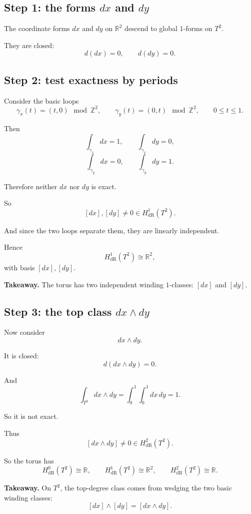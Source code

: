 \documentclass[11pt]{article}
\newenvironment{takeaway}
{\begin{framed}\noindent\textbf{Takeaway. }}
{\end{framed}}
\begin{document}
\subsection{Step 1: the forms \(dx\) and \(dy\)}

The coordinate forms \(dx\) and \(dy\) on \(\mathbb{R}^2\) descend to global \(1\)-forms on \(T^2\).

They are closed:
\[
d(dx)=0,\qquad d(dy)=0.
\]

\subsection{Step 2: test exactness by periods}

Consider the basic loops
\[
\gamma_x(t)=(t,0)\mod\mathbb{Z}^2,\qquad
\gamma_y(t)=(0,t)\mod\mathbb{Z}^2,\qquad 0\le t\le 1.
\]

Then
\[
\int_{\gamma_x}dx=1,\qquad \int_{\gamma_x}dy=0,
\]
\[
\int_{\gamma_y}dx=0,\qquad \int_{\gamma_y}dy=1.
\]

Therefore neither \(dx\) nor \(dy\) is exact.

So
\[
[dx],[dy]\neq 0 \in H^1_{\mathrm{dR}}(T^2).
\]

And since the two loops separate them, they are linearly independent.

Hence
\[
H^1_{\mathrm{dR}}(T^2)\cong \mathbb{R}^2,
\]
with basis \([dx],[dy]\).

\begin{takeaway}
The torus has two independent winding \(1\)-classes: \([dx]\) and \([dy]\).
\end{takeaway}

\subsection{Step 3: the top class \(dx\wedge dy\)}

Now consider
\[
dx\wedge dy.
\]

It is closed:
\[
d(dx\wedge dy)=0.
\]

And
\[
\int_{T^2}dx\wedge dy
=
\int_0^1\int_0^1 dx\,dy
=
1.
\]

So it is not exact.

Thus
\[
[dx\wedge dy]\neq 0 \in H^2_{\mathrm{dR}}(T^2).
\]

So the torus has
\[
H^0_{\mathrm{dR}}(T^2)\cong\mathbb{R},\qquad
H^1_{\mathrm{dR}}(T^2)\cong\mathbb{R}^2,\qquad
H^2_{\mathrm{dR}}(T^2)\cong\mathbb{R}.
\]

\begin{takeaway}
On \(T^2\), the top-degree class comes from wedging the two basic winding classes:
\[
[dx]\wedge[dy]=[dx\wedge dy].
\]
\end{takeaway}
\end{document}

